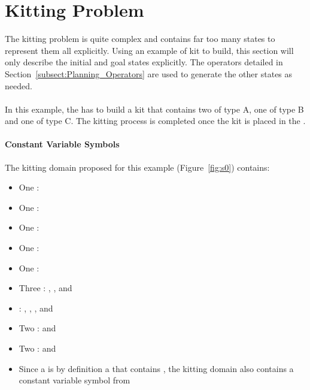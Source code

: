 \section{Kitting Problem}
\label{S:kitting-problem}
The kitting problem is quite complex and contains far too many states to represent them all explicitly. Using an example of kit to build, this section will only describe the initial and goal states explicitly. The operators detailed in Section~\ref{subsect:Planning_Operators} are used to generate the other states as needed. \\ \\
In this example, the  has to build a kit that contains two  of type A, one  of type B and one  of type C. The kitting process is completed once the kit is placed in the .
\paragraph{Constant Variable Symbols}
The kitting domain proposed for this example (Figure~\ref{fig:s0}) contains:
\begin{itemize}
\item One : 
\item One : 
\item One : 
\item One : 
\item One : 
\item Three : , , and 
\item {}: , , , and 
\item Two :  and 
\item Two  :  and 
\item Since a  is by definition a  that contains , the kitting domain also contains a constant variable symbol  from 
\end{itemize} 
 



